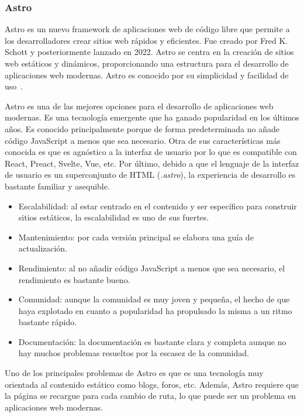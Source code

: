 \subsubsection{Astro}

Astro es un nuevo framework de aplicaciones web de código libre que permite a los desarrolladores crear sitios web rápidos y eficientes. Fue creado por Fred K. Schott y posteriormente lanzado en 2022. Astro se centra en la creación de sitios web estáticos y dinámicos, proporcionando una estructura para el desarrollo de aplicaciones web modernas. Astro es conocido por su simplicidad y facilidad de uso~\cite{astro-wikipedia}.

Astro es una de las mejores opciones para el desarrollo de aplicaciones web modernas. Es una tecnología emergente que ha ganado popularidad en los últimos años. Es conocido principalmente porque de forma predeterminada no añade código JavaScript a menos que sea necesario. Otra de sus características más conocida es que es agnóstico a la interfaz de usuario por lo que es compatible con React, Preact, Svelte, Vue, etc. Por último, debido a que el lenguaje de la interfaz de usuario es un superconjunto de HTML (\textit{.astro}), la experiencia de desarrollo es bastante familiar y asequible.

\begin{itemize}
    \item[\bien] Escalabilidad: al estar centrado en el contenido y ser específico para construir sitios estáticos, la escalabilidad es uno de sus fuertes.
    \item[\bien] Mantenimiento: por cada versión principal se elabora una guía de actualización.
    \item[\esp] Rendimiento: al no añadir código JavaScript a menos que sea necesario, el rendimiento es bastante bueno.
    \item[\regular] Comunidad: aunque la comunidad es muy joven y pequeña, el hecho de que haya explotado en cuanto a popularidad ha propulsado la misma a un ritmo bastante rápido.
    \item[\regular] Documentación: la documentación es bastante clara y completa aunque no hay muchos problemas resueltos por la escasez de la comunidad.
\end{itemize}

Uno de los principales problemas de Astro es que es una tecnología muy orientada al contenido estático como blogs, foros, etc. Además, Astro requiere que la página se recargue para cada cambio de ruta, lo que puede ser un problema en aplicaciones web modernas.

